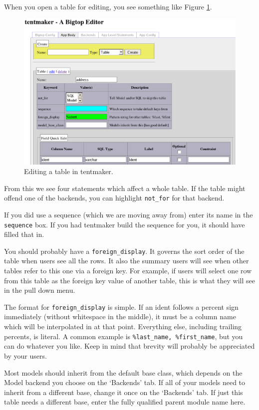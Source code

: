 When you open a table for editing, you see something like Figure
\ref{fig:tableedit}.

\begin{figure}
\includegraphics[width=6in]{tableedit}
\caption{Editing a table in tentmaker.}
\label{fig:tableedit}
\end{figure}

From this we see four statements which affect a whole table.  If the table
might offend one of the backends, you can highlight \verb+not_for+ for
that backend.

If you did use a sequence (which we are moving away from) enter its name
in the \verb+sequence+ box.  If you had tentmaker build the sequence for you, it
should have filled that in.

You should probably have a \verb+foreign_display+.  It governs the sort order
of the table when users see all the rows.  It also the summary users will
see when other tables refer to this one via a foreign key.  For example,
if users will select one row from this table as the foreign key value of
another table, this is what they will see in the pull down menu.

The format for \verb+foreign_display+ is simple.  If an ident follows a
percent sign immediately (without whitespace in the middle), it must
be a column name which will be interpolated in at that point.  Everything
else, including trailing percents, is literal.  A common example is
\verb+%last_name, %first_name+, but you can do whatever you like.  Keep in
mind that brevity will probably be appreciated by your users.

Most models should inherit from the default base class, which depends on
the Model backend you choose on the `Backends' tab.  If all of your models
need to inherit from a different base, change it once on the `Backends' tab.
If just this table needs a different base, enter the fully qualified
parent module name here.

